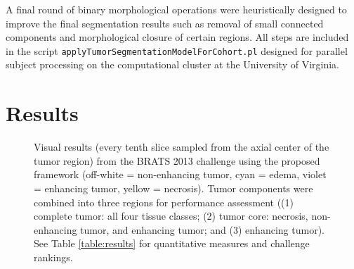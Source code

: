 \documentclass[preprint,authoryear,review,12pt]{elsarticle}
\begin{document}
A final round of binary morphological operations were heuristically designed
to improve the final segmentation results such as removal of small connected 
components and morphological closure of certain regions.
All steps are included in the script 
{\tt applyTumorSegmentationModelForCohort.pl} designed for parallel subject 
processing on the computational cluster at the University of Virginia.




%
%

\section{Results}


\begin{figure}
  \vspace{-20mm}
  \caption{Visual results (every tenth slice sampled from the axial center of the
  tumor region) from the BRATS 2013 challenge using the proposed
  framework (off-white = non-enhancing tumor, cyan = edema, violet = enhancing 
  tumor, yellow = necrosis).  Tumor components were combined into
  three regions for performance assessment ((1) complete tumor: all four tissue
  classes; (2) tumor core:  necrosis, non-enhancing tumor, and enhancing tumor;
  and (3) enhancing tumor).  See Table \ref{table:results} for quantitative measures
  and challenge rankings.
  }
  \label{fig:challengeresults}
\end{figure}
\end{document}
